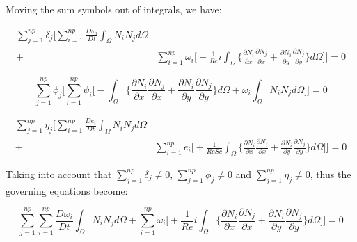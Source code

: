 \medksip
\noindent
Moving the sum symbols out of integrals, we have:

\begin{equation}
 \begin{aligned} 
  \sum\limits_{j=1}^{np} \delta_j \Bigg[
  \sum\limits_{i=1}^{np} \frac{D \omega_i}{Dt} 
  \int_{\Omega} N_i N_j d\Omega & 
  \\[5pt]
   + & \sum\limits_{i=1}^{np} \omega_i \Bigg[
   + \frac{1}{\textit{Re}} i
   \int_{\Omega} \Bigg\{ 
   \frac{\partial N_i}{\partial x} 
   \frac{\partial N_j}{\partial x} 
   + 
   \frac{\partial N_i}{\partial y} 
   \frac{\partial N_j}{\partial y} 
   \Bigg\} d\Omega
 \Bigg] \Bigg] = 0
 \end{aligned}
\end{equation}

\begin{equation}
  \sum\limits_{j=1}^{np} \phi_j \Bigg[
  \sum\limits_{i=1}^{np} \psi_i \Bigg[
  - \int_{\Omega} \Bigg\{ 
                  \frac{\partial N_i}{\partial x} 
                  \frac{\partial N_j}{\partial x} 
  +               \frac{\partial N_i}{\partial y} 
                  \frac{\partial N_j}{\partial y} 
  \Bigg\} d\Omega
  + \omega_i \int_{\Omega} N_i N_j d\Omega
  \Bigg] \Bigg] = 0
\end{equation}

\begin{equation}
 \begin{aligned} 
  \sum\limits_{j=1}^{np} \eta_j \Bigg[
  \sum\limits_{i=1}^{np} \frac{D e_i}{Dt} 
  \int_{\Omega} N_i N_j d\Omega & 
  \\[5pt]
   + & \sum\limits_{i=1}^{np} e_i \Bigg[
   + \frac{1}{\textit{ReSc}} 
   \int_{\Omega} \Bigg\{ 
   \frac{\partial N_i}{\partial x} 
   \frac{\partial N_j}{\partial x} 
   + 
   \frac{\partial N_i}{\partial y} 
   \frac{\partial N_j}{\partial y} 
   \Bigg\} d\Omega
 \Bigg] \Bigg] = 0
 \end{aligned}
\end{equation}


\noindent
Taking into account that
$\sum\limits_{j=1}^{np} \delta_j \neq 0$,
$\sum\limits_{j=1}^{np} \phi_j \neq 0$ and
$\sum\limits_{j=1}^{np} \eta_j \neq 0$,
thus the governing equations become:

\begin{equation}
  \sum\limits_{j=1}^{np}
  \sum\limits_{i=1}^{np} \frac{D \omega_i}{Dt} 
  \int_{\Omega} N_i N_j d\Omega 
   + \sum\limits_{i=1}^{np} \omega_i \Bigg[
   + \frac{1}{\textit{Re}} i
   \int_{\Omega} \Bigg\{ 
   \frac{\partial N_i}{\partial x} 
   \frac{\partial N_j}{\partial x} 
   + 
   \frac{\partial N_i}{\partial y} 
   \frac{\partial N_j}{\partial y} 
   \Bigg\} d\Omega
 \Bigg] \Bigg] = 0
\end{equation}

